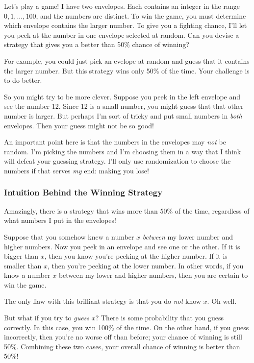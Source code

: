 Let's play a game!  I have two envelopes.  Each contains an integer in
the range $0, 1, \dots, 100$, and the numbers are distinct.  To win
the game, you must determine which envelope contains the larger
number.  To give you a fighting chance, I'll let you peek at the
number in one envelope selected at random.  Can you devise a strategy
that gives you a better than 50\% chance of winning?

For example, you could just pick an evelope at random and guess that
it contains the larger number.  But this strategy wins only 50\% of
the time.  Your challenge is to do better.

So you might try to be more clever.  Suppose you peek in the left
envelope and see the number 12.  Since 12 is a small number, you might
guess that that other number is larger.  But perhaps I'm sort of
tricky and put small numbers in \textit{both} envelopes.  Then your
guess might not be so good!

An important point here is that the numbers in the envelopes may
\textit{not} be random.  I'm picking the numbers and I'm choosing them
in a way that I think will defeat your guessing strategy.  I'll only
use randomization to choose the numbers if that serves \textit{my}
end:  making you lose!

\subsubsection{Intuition Behind the Winning Strategy}

Amazingly, there is a strategy that wins more than 50\% of the time,
regardless of what numbers I put in the envelopes!

Suppose that you somehow knew a number $x$ \textit{between} my lower
number and higher numbers.  Now you peek in an envelope and see one or
the other.  If it is bigger than $x$, then you know you're peeking at
the higher number.  If it is smaller than $x$, then you're peeking at
the lower number.  In other words, if you know a number $x$ between
my lower and higher numbers, then you are certain to win the game.

The only flaw with this brilliant strategy is that you do \textit{not}
know $x$.  Oh well.

But what if you try to \textit{guess} $x$?  There is some probability
that you guess correctly.  In this case, you win 100\% of the time.
On the other hand, if you guess incorrectly, then you're no worse off
than before; your chance of winning is still 50\%.  Combining these
two cases, your overall chance of winning is better than 50\%!

